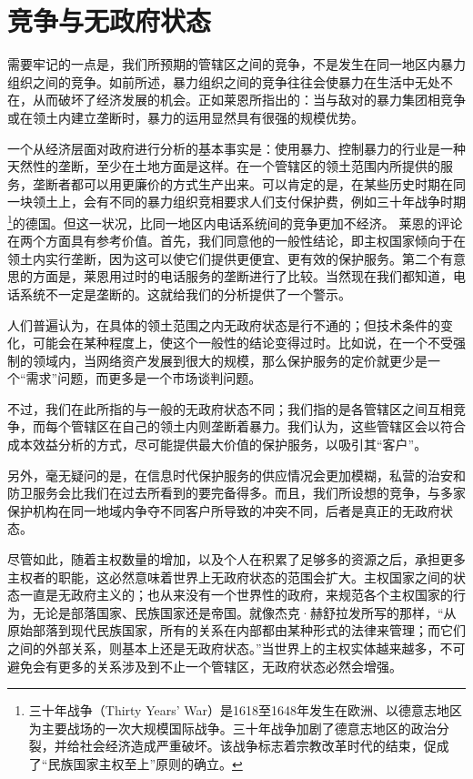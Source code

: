 \section{竞争与无政府状态}
需要牢记的一点是，我们所预期的管辖区之间的竞争，不是发生在同一地区内暴力组织之间的竞争。如前所述，暴力组织之间的竞争往往会使暴力在生活中无处不在，从而破坏了经济发展的机会。正如莱恩所指出的：当与敌对的暴力集团相竞争或在领土内建立垄断时，暴力的运用显然具有很强的规模优势。

一个从经济层面对政府进行分析的基本事实是：使用暴力、控制暴力的行业是一种天然性的垄断，至少在土地方面是这样。在一个管辖区的领土范围内所提供的服务，垄断者都可以用更廉价的方式生产出来。可以肯定的是，在某些历史时期在同一块领土上，会有不同的暴力组织竞相要求人们支付保护费，例如三十年战争时期\footnote{三十年战争（Thirty Years' War）是1618至1648年发生在欧洲、以德意志地区为主要战场的一次大规模国际战争。三十年战争加剧了德意志地区的政治分裂，并给社会经济造成严重破坏。该战争标志着宗教改革时代的结束，促成了“民族国家主权至上”原则的确立。}的德国。但这一状况，比同一地区内电话系统间的竞争更加不经济。 莱恩的评论在两个方面具有参考价值。首先，我们同意他的一般性结论，即主权国家倾向于在领土内实行垄断，因为这可以使它们提供更便宜、更有效的保护服务。第二个有意思的方面是，莱恩用过时的电话服务的垄断进行了比较。当然现在我们都知道，电话系统不一定是垄断的。这就给我们的分析提供了一个警示。

人们普遍认为，在具体的领土范围之内无政府状态是行不通的；但技术条件的变化，可能会在某种程度上，使这个一般性的结论变得过时。比如说，在一个不受强制的领域内，当网络资产发展到很大的规模，那么保护服务的定价就更少是一个“需求”问题，而更多是一个市场谈判问题。

不过，我们在此所指的与一般的无政府状态不同；我们指的是各管辖区之间互相竞争，而每个管辖区在自己的领土内则垄断着暴力。我们认为，这些管辖区会以符合成本效益分析的方式，尽可能提供最大价值的保护服务，以吸引其“客户”。

另外，毫无疑问的是，在信息时代保护服务的供应情况会更加模糊，私营的治安和防卫服务会比我们在过去所看到的要完备得多。而且，我们所设想的竞争，与多家保护机构在同一地域内争夺不同客户所导致的冲突不同，后者是真正的无政府状态。

尽管如此，随着主权数量的增加，以及个人在积累了足够多的资源之后，承担更多主权者的职能，这必然意味着世界上无政府状态的范围会扩大。主权国家之间的状态一直是无政府主义的；也从来没有一个世界性的政府，来规范各个主权国家的行为，无论是部落国家、民族国家还是帝国。就像杰克·赫舒拉发所写的那样，“从原始部落到现代民族国家，所有的关系在内部都由某种形式的法律来管理；而它们之间的外部关系，则基本上还是无政府状态。”当世界上的主权实体越来越多，不可避免会有更多的关系涉及到不止一个管辖区，无政府状态必然会增强。


